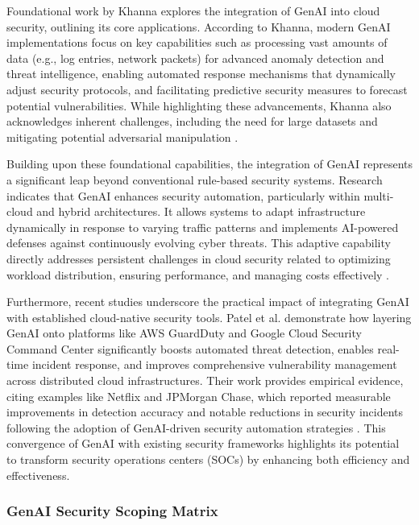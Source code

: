 Foundational work by Khanna \cite{khanna_enhancing_2024} explores the integration of GenAI into cloud security, outlining its core applications. According to Khanna, modern GenAI implementations focus on key capabilities such as processing vast amounts of data (e.g., log entries, network packets) for advanced anomaly detection and threat intelligence, enabling automated response mechanisms that dynamically adjust security protocols, and facilitating predictive security measures to forecast potential vulnerabilities. While highlighting these advancements, Khanna also acknowledges inherent challenges, including the need for large datasets and mitigating potential adversarial manipulation \cite{khanna_enhancing_2024}.

Building upon these foundational capabilities, the integration of GenAI represents a significant leap beyond conventional rule-based security systems. Research indicates that GenAI enhances security automation, particularly within multi-cloud and hybrid architectures. It allows systems to adapt infrastructure dynamically in response to varying traffic patterns and implements AI-powered defenses against continuously evolving cyber threats. This adaptive capability directly addresses persistent challenges in cloud security related to optimizing workload distribution, ensuring performance, and managing costs effectively \cite{seth_ai_2025}.

Furthermore, recent studies underscore the practical impact of integrating GenAI with established cloud-native security tools. Patel et al. \cite{patel_generative_2025} demonstrate how layering GenAI onto platforms like AWS GuardDuty and Google Cloud Security Command Center significantly boosts automated threat detection, enables real-time incident response, and improves comprehensive vulnerability management across distributed cloud infrastructures. Their work provides empirical evidence, citing examples like Netflix and JPMorgan Chase, which reported measurable improvements in detection accuracy and notable reductions in security incidents following the adoption of GenAI-driven security automation strategies \cite{patel_generative_2025}. This convergence of GenAI with existing security frameworks highlights its potential to transform security operations centers (SOCs) by enhancing both efficiency and effectiveness.


\subsubsection{GenAI Security Scoping Matrix} %
\label{sec: GenAI Security Scoping Matrix}

